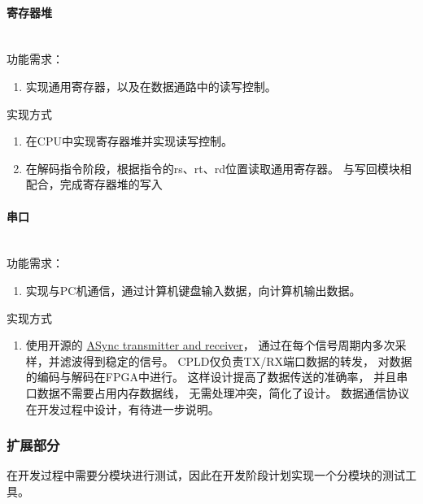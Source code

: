            \paragraph{寄存器堆}
                \mbox{} \\ 

                功能需求：
                \begin{enumerate}
                \item
                实现通用寄存器，以及在数据通路中的读写控制。
                \end{enumerate}

                实现方式
                \begin{enumerate}
                \item
                在CPU中实现寄存器堆并实现读写控制。
                \item
                在解码指令阶段，根据指令的rs、rt、rd位置读取通用寄存器。
                与写回模块相配合，完成寄存器堆的写入
                \end{enumerate}

            \paragraph{串口}
                \mbox{} \\

                功能需求：
                \begin{enumerate}
                \item
                实现与PC机通信，通过计算机键盘输入数据，向计算机输出数据。
                \end{enumerate}

                实现方式
                \begin{enumerate}
                \item
                使用开源的%
                \href{http://www.fpga4fun.com/SerialInterface.html}{ASync transmitter and receiver}，%
                通过在每个信号周期内多次采样，并滤波得到稳定的信号。%
                CPLD仅负责TX/RX端口数据的转发，%
                对数据的编码与解码在FPGA中进行。%
                这样设计提高了数据传送的准确率，%
                并且串口数据不需要占用内存数据线，%
                无需处理冲突，简化了设计。%
                数据通信协议在开发过程中设计，有待进一步说明。

                \end{enumerate}
        \subsubsection{扩展部分}
            在开发过程中需要分模块进行测试，因此在开发阶段计划实现一个分模块的测试工具。

